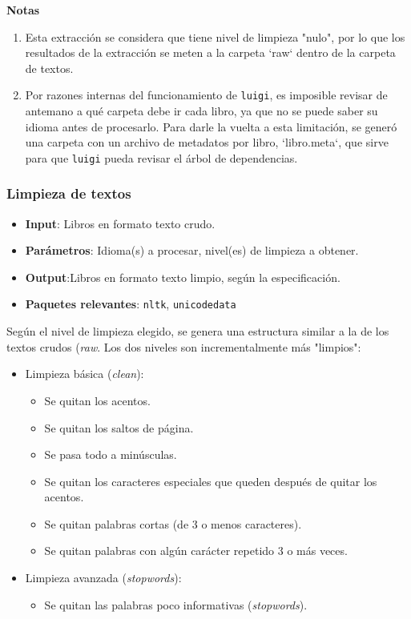 \textbf{Notas}
\begin{enumerate}
\item Esta extracción se considera que tiene nivel de limpieza "nulo", por lo que los resultados de la extracción se meten a la carpeta `raw` dentro de la carpeta de textos.
\item Por razones internas del funcionamiento de \texttt{luigi}, es imposible revisar de antemano a qué carpeta debe ir cada libro, ya que no se puede saber su idioma antes de procesarlo. Para darle la vuelta a esta limitación, se generó una carpeta con un archivo de metadatos por libro, `libro.meta`, que sirve para que \texttt{luigi} pueda revisar el árbol de dependencias.
\end{enumerate}


\subsubsection{Limpieza de textos}

\begin{itemize}
\item \textbf{Input}: Libros en formato texto crudo.
\item \textbf{Parámetros}: Idioma(s) a procesar, nivel(es) de limpieza a obtener.
\item \textbf{Output}:Libros en formato texto limpio, según la especificación.
\item \textbf{Paquetes relevantes}: \texttt{nltk}, \texttt{unicodedata}
\end{itemize}


Según el nivel de limpieza elegido, se genera una estructura similar a la de los textos crudos (\emph{raw}. Los dos niveles son incrementalmente más "limpios":
\begin{itemize}
\item Limpieza básica (\emph{clean}):
    \begin{itemize}
   \item Se quitan los acentos.
   \item Se quitan los saltos de página.
    \item Se pasa todo a minúsculas.
    \item  Se quitan los caracteres especiales que queden después de quitar los acentos.
    \item  Se quitan palabras cortas (de 3 o menos caracteres).
    \item Se quitan palabras con algún carácter repetido 3 o más veces.
    \end{itemize}
\item Limpieza avanzada (\emph{stopwords}):
    \begin{itemize}
   \item  Se quitan las palabras poco informativas (\emph{stopwords}).
    \end{itemize}
\end{itemize}

